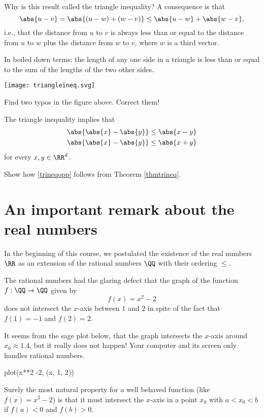 \documentclass{article}
\begin{document}
  Why is this result called the triangle inequality? A consequence is that
  $$
  \abs{u - v}  = \abs{(u - w) + (w - v)} \leq \abs{u - w} + \abs{w - v},
  $$
  i.e., that the distance from $u$ to $v$ is always less than or equal to
  the distance from $u$ to $w$ plus the distance from $w$ to $v$, where
  $w$ is a third vector.

  In boiled down terms: the length of any one side in a triangle is
  less than or equal to the sum of the lengths of the two other sides.


\texttt{[image: triangleineq.svg]}

\beginshex
Find two typos in the figure above. Correct them!
\endshex

The triangle inequality implies that
\begin{align}\label{trineqopp}
  \abs{\abs{x}-\abs{y}} &\leq \abs{x - y}\\
  \abs{\abs{x}-\abs{y}} &\leq \abs{x + y}
\end{align}
for every $x, y\in \RR^d$.

\beginshex
  Show how \eqref{trineqopp} follows from Theorem \ref{thmtrineq}. 
\endshex




\section{An important remark about the real numbers}

In the beginning of this course, we postulated the existence of the real
numbers $\RR$ as an extension of the rational numbers $\QQ$ with their ordering $\leq$.

The rational numbers had the glaring defect that the graph of the function $f:\QQ\rightarrow \QQ$ given by
$$
f(x) = x^2 - 2
$$
does not intersect the $x$-axis between $1$ and $2$ in spite of the
fact that $f(1) = -1$ and $f(2) = 2$.


It seems from the sage plot below, that the graph intersects the
$x$-axis around $x_0\approx 1.4$, but it really does not happen!
Your computer and its screen only
handles rational numbers.

\begin{sage}
  plot(x**2 -2, (x, 1, 2))
\end{sage}

Surely the most natural property for a well behaved function
(like $f(x) = x^2 - 2$) is that it must intersect the $x$-axis
in a point $x_0$ with $a < x_0 < b$ if $f(a) < 0$ and $f(b) > 0$.
\end{document}
